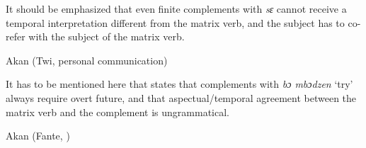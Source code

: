 \documentclass[output=paper]{langscibook}
\begin{document}
It should be emphasized that even finite complements with \textit{sɛ} cannot receive a temporal interpretation different from the matrix verb, and the subject has to co-refer with the subject of the matrix verb. 


\begin{exe}
\ex \label{Paj23} Akan (Twi, personal communication) 
\begin{xlist}



\end{xlist}
\end{exe}

It has to be mentioned here that \citet[29]{osam1998} states that complements with \emph{bɔ mbɔdzen} `try’ always require overt future, and that aspectual/temporal agreement between the matrix verb and the complement is ungrammatical.

\begin{exe}
\ex \label{Paj24} Akan (Fante, \citealt[29]{osam1998}) 
\begin{xlist}



\end{xlist}
\end{exe}
\end{document}
